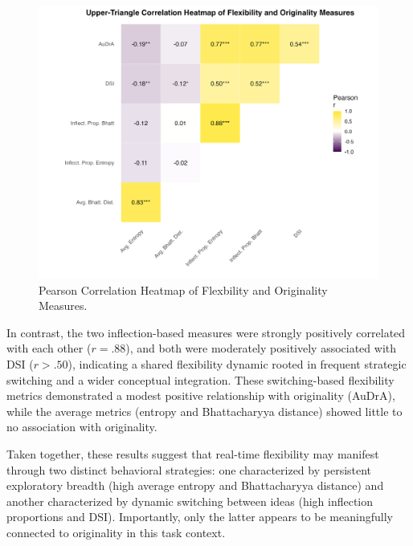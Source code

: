 \documentclass[../MA_Thesis.tex]{subfiles}
\begin{document}
\begin{figure}[H]
  \centering
  \includegraphics[width=\textwidth]{../analysis/results/main_results/correlation/correlation_heatmap.png}
  \caption{
    Pearson Correlation Heatmap of Flexbility and Originality Measures.
  }
  \label{fig:cor_heatmap}
\end{figure}

In contrast, the two inflection-based measures were strongly positively correlated with each other ($r = .88$), and both were moderately positively associated with DSI ($r > .50$), indicating a shared flexibility dynamic rooted in frequent strategic switching and a wider conceptual integration. These switching-based flexibility metrics demonstrated a modest positive relationship with originality (AuDrA), while the average metrics (entropy and Bhattacharyya distance) showed little to no association with originality.

Taken together, these results suggest that real-time flexibility may manifest through two distinct behavioral strategies: one characterized by persistent exploratory breadth (high average entropy and Bhattacharyya distance) and another characterized by dynamic switching between ideas (high inflection proportions and DSI). Importantly, only the latter appears to be meaningfully connected to originality in this task context.
\end{document}
